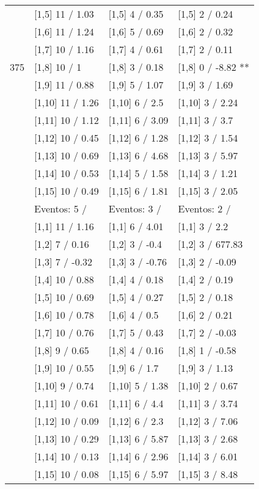 \begin{table}
\begin{tabular}[t]{llll}
 & {}[1,5] 11  / 1.03 & {}[1,5] 4  / 0.35 & {}[1,5] 2  / 0.24\\
 & {}[1,6] 11  / 1.24 & {}[1,6] 5  / 0.69 & {}[1,6] 2  / 0.32\\
 & {}[1,7] 10  / 1.16 & {}[1,7] 4  / 0.61 & {}[1,7] 2  / 0.11\\
375 & {}[1,8] 10  / 1 & {}[1,8] 3  / 0.18 & {}[1,8] 0  / -8.82 **\\
\addlinespace
 & {}[1,9] 11  / 0.88 & {}[1,9] 5  / 1.07 & {}[1,9] 3  / 1.69\\
 & {}[1,10] 11  / 1.26 & {}[1,10] 6  / 2.5 & {}[1,10] 3  / 2.24\\
 & {}[1,11] 10  / 1.12 & {}[1,11] 6  / 3.09 & {}[1,11] 3  / 3.7\\
 & {}[1,12] 10  / 0.45 & {}[1,12] 6  / 1.28 & {}[1,12] 3  / 1.54\\
 & {}[1,13] 10  / 0.69 & {}[1,13] 6  / 4.68 & {}[1,13] 3  / 5.97\\
\addlinespace
 & {}[1,14] 10  / 0.53 & {}[1,14] 5  / 1.58 & {}[1,14] 3  / 1.21\\
 & {}[1,15] 10  / 0.49 & {}[1,15] 6  / 1.81 & {}[1,15] 3  / 2.05\\
 & Eventos:  5 / & Eventos:  3 / & Eventos:  2 /\\
 & {}[1,1] 11  / 1.16 & {}[1,1] 6  / 4.01 & {}[1,1] 3  / 2.2\\
 & {}[1,2] 7  / 0.16 & {}[1,2] 3  / -0.4 & {}[1,2] 3  / 677.83\\
\addlinespace
 & {}[1,3] 7  / -0.32 & {}[1,3] 3  / -0.76 & {}[1,3] 2  / -0.09\\
 & {}[1,4] 10  / 0.88 & {}[1,4] 4  / 0.18 & {}[1,4] 2  / 0.19\\
 & {}[1,5] 10  / 0.69 & {}[1,5] 4  / 0.27 & {}[1,5] 2  / 0.18\\
 & {}[1,6] 10  / 0.78 & {}[1,6] 4  / 0.5 & {}[1,6] 2  / 0.21\\
 & {}[1,7] 10  / 0.76 & {}[1,7] 5  / 0.43 & {}[1,7] 2  / -0.03\\
\addlinespace
500 & {}[1,8] 9  / 0.65 & {}[1,8] 4  / 0.16 & {}[1,8] 1  / -0.58\\
 & {}[1,9] 10  / 0.55 & {}[1,9] 6  / 1.7 & {}[1,9] 3  / 1.13\\
 & {}[1,10] 9  / 0.74 & {}[1,10] 5  / 1.38 & {}[1,10] 2  / 0.67\\
 & {}[1,11] 10  / 0.61 & {}[1,11] 6  / 4.4 & {}[1,11] 3  / 3.74\\
 & {}[1,12] 10  / 0.09 & {}[1,12] 6  / 2.3 & {}[1,12] 3  / 7.06\\
\addlinespace
 & {}[1,13] 10  / 0.29 & {}[1,13] 6  / 5.87 & {}[1,13] 3  / 2.68\\
 & {}[1,14] 10  / 0.13 & {}[1,14] 6  / 2.96 & {}[1,14] 3  / 6.01\\
 & {}[1,15] 10  / 0.08 & {}[1,15] 6  / 5.97 & {}[1,15] 3  / 8.48\\
\bottomrule
\end{tabular}
\end{table}
